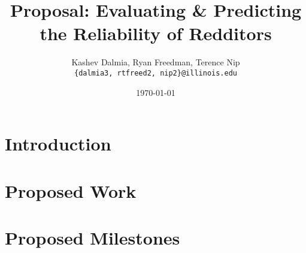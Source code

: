 \documentclass[a4paper]{article}
\title{Proposal: Evaluating \& Predicting the Reliability of Redditors}
\author{Kashev Dalmia, Ryan Freedman, Terence Nip \\
        \texttt{\{dalmia3, rtfreed2, nip2\}@illinois.edu}
       }
\date{\today}
\begin{document}
\maketitle

\begin{abstract}
\label{sec:abstract}

\end{abstract}

\section{Introduction}
\label{sec:introduction}


\section{Proposed Work}
\label{sec:proposed_work}


\section{Proposed Milestones}
\label{sec:proposed_milestones}

\end{document}

